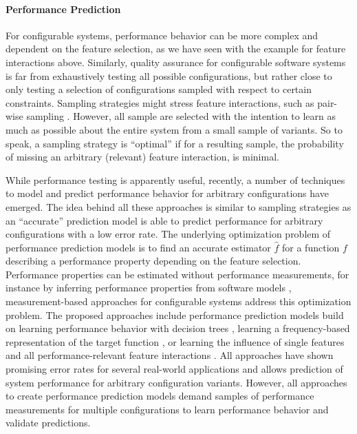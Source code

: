 \paragraph{Performance Prediction}
For configurable systems, performance behavior can be more complex and
dependent on the feature selection, as we have seen with the example for
feature interactions above. Similarly, quality assurance for configurable
software systems is far from exhaustively testing all possible configurations,
but rather close to only testing a selection of configurations sampled with
respect to certain constraints. Sampling strategies might stress feature
interactions, such as pair-wise sampling \citep{apel_feature-oriented_2013}.
However, all sample are selected with the intention to learn as much as possible
about the entire system from a small sample of variants. So to speak, a
sampling strategy is ``optimal'' if for a resulting sample, the probability of missing an
arbitrary (relevant) feature interaction, is minimal.

While performance testing is apparently useful, recently, a number of techniques
to model and predict performance behavior for arbitrary configurations have
emerged. The idea behind all these approaches is similar to sampling strategies
as an ``accurate'' prediction model is able to predict performance for
arbitrary configurations with a low error rate.
The underlying optimization problem of performance prediction models is to find
an accurate estimator $\hat{f}$ for a function $f$ describing a performance
property depending on the feature selection. Performance properties can be
estimated without performance measurements, for instance by inferring
performance properties from software models \citep{woodside_future_2007},
measurement-based approaches for configurable systems address this optimization
problem.  The proposed approaches include performance prediction models build on
learning performance behavior with decision trees
\citep{guo_variability-aware_2013}, learning a frequency-based representation
of the target function \citep{zhang_performance_2015}, or learning the
influence of single features and all performance-relevant feature interactions
\citep{siegmund_predicting_2012,siegmund_performance-influence_2015}. All
approaches have shown promising error rates for several real-world applications
and allows prediction of system performance for arbitrary configuration
variants. However, all approaches to create performance prediction models
demand samples of performance measurements for multiple configurations to
learn performance behavior and validate predictions.


